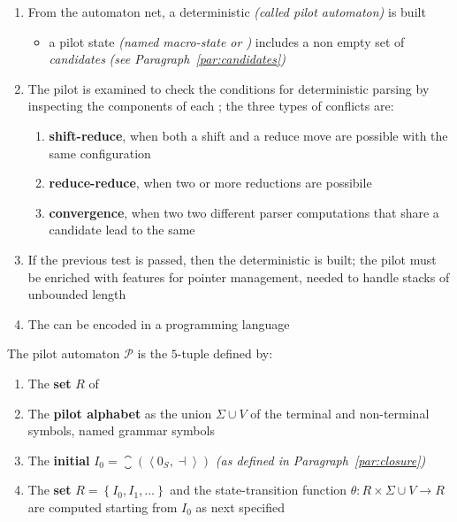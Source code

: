 \documentclass[english]{article}
\begin{document}
\begin{enumerate}
  \item From the automaton net, a deterministic \FSA \textit{(called pilot automaton)} is built
        \begin{itemize}
          \item a pilot state \textit{(named macro-state or \mstate)} includes a non empty set of \textit{candidates} \textit{(see Paragraph~\ref{par:candidates})}
        \end{itemize}
  \item The pilot is examined to check the conditions for deterministic parsing by inspecting the components of each \mstate; the three types of conflicts are:
        \begin{enumerate}
          \item \textbf{shift-reduce}, when both a shift and a reduce move are possible with the same configuration
          \item \textbf{reduce-reduce}, when two or more reductions are possibile
          \item \textbf{convergence}, when two two different parser computations that share a candidate lead to the same \mstate
        \end{enumerate}
  \item If the previous test is passed, then the deterministic \PDA is built; the pilot \FSA must be enriched with features for pointer management, needed to handle stacks of unbounded length
  \item The \PDA can be encoded in a programming language
\end{enumerate}

\bigskip
The pilot automaton \(\mathcal{P}\) is the \(5\)-tuple defined by:

\begin{enumerate}
  \item The \textbf{set} \(R\) of \mstates
  \item The \textbf{pilot alphabet} as the union \(\Sigma \cup V\) of the terminal and non-terminal symbols, named grammar symbols
  \item The \textbf{initial \mstate} \(I_0 = \closure\left( \left\langle 0_S, \dashv \right\rangle \right)\) \textit{(as defined in Paragraph~\ref{par:closure})}
  \item The \textbf{\mstate set} \(R = \left\{ I_0, I_1, \ldots \right\}\) and the state-transition function \(\theta: R \times \Sigma \cup V \rightarrow R\) are computed starting from \(I_0\) as next specified
\end{enumerate}
\end{document}
